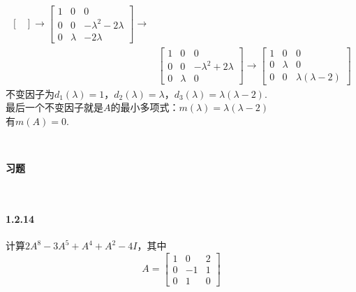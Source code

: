 \documentclass[12pt, a4paper, oneside, fontset=none]{ctexart}
\begin{document}
\begin{align*}
\begin{bmatrix}
                      \end{bmatrix} \to  \begin{bmatrix}
                                             1 & 0       & 0                     \\
                                             0 & 0       & -\lambda^2 - 2\lambda \\
                                             0 & \lambda & -2\lambda
                                         \end{bmatrix} \to  \\
                    & \begin{bmatrix}
                          1 & 0       & 0                     \\
                          0 & 0       & -\lambda^2 + 2\lambda \\
                          0 & \lambda & 0
                      \end{bmatrix} \to \begin{bmatrix}
                                            1 & 0       & 0                    \\
                                            0 & \lambda & 0                    \\
                                            0 & 0       & \lambda(\lambda - 2)
                                        \end{bmatrix}
\end{align*}
不变因子为$d_1(\lambda)=1$，$d_2(\lambda) = \lambda$，$d_3(\lambda) = \lambda(\lambda -2).$\\
最后一个不变因子就是$A$的最小多项式：$m(\lambda) = \lambda(\lambda -2)$\\
有$m(A) = 0.$
\par \ \par

\centerline{\large{\textbf{习题}}} \ \par

\paragraph*{1.2.14} 计算$2A^8 - 3A^5 + A^4 + A^2 - 4I$，其中
\begin{equation*}
    A = \begin{bmatrix}
        1 & 0  & 2 \\
        0 & -1 & 1 \\
        0 & 1  & 0
    \end{bmatrix}
\end{equation*}
\end{document}
